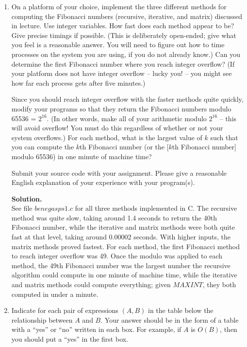 \documentclass[11pt]{article}
\newcommand\solution{%
  \textbf{Solution.}\\%
}
\begin{document}
\begin{enumerate}
\item On a platform of your choice, implement the three different
methods for computing the Fibonacci numbers (recursive, iterative, and
matrix) discussed in lecture.  Use integer variables.  How fast does
each method appear to be?  Give precise timings if possible.  (This is
deliberately open-ended; give what you feel is a reasonable answer.
You will need to figure out how to time processes on the system you
are using, if you do not already know.)  Can you determine the first
Fibonacci number where you reach integer overflow?  (If your platform
does not have integer overflow -- lucky you! -- you might see how far
each process gets after five minutes.)

Since you should reach integer overflow with the faster methods quite
quickly, modify your programs so that they return the Fibonacci
numbers modulo 65536 = $2^{16}$. (In other words, make all of your
arithmetic modulo $2^{16}$ -- this will avoid overflow!  You must do
this regardless of whether or not your system overflows.)  For each
method, what is the largest value of $k$ such that you can compute the $k$th Fibonacci number 
(or the [$k$th Fibonacci number] modulo 65536) in one minute of machine time?  

Submit your source code with your assignment.  Please give
a reasonable English explanation of your experience with your program(s).

\solution
See file $benegas ps1.c$ for all three methods implemented in C. The recursive method was quite slow, taking around 1.4 seconds to return the 40th Fibonacci number, while the iterative and matrix methods were both quite fast at that level, taking around 0.00002 seconds. With higher inputs, the matrix methods proved fastest. For each method, the first Fibonacci method to reach integer overflow was 49. Once the modulo was applied to each method, the 49th Fibonacci number was the largest number the recursive algorithm could compute in one minute of machine time, while the iterative and matrix methods could compute everything; given $MAX INT$, they both computed in under a minute. 

\item Indicate for each pair of expressions $(A,B)$ in the table below
the relationship between $A$ and $B$.  Your answer should be in the
form of a table with a ``yes'' or ``no'' written in each box.  For
example, if $A$ is $O(B)$, then you should put a ``yes'' in the 
first box.


\end{enumerate}
\end{document}
